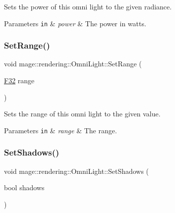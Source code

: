 Sets the power of this omni light to the given radiance.


\begin{DoxyParams}[1]{Parameters}
\mbox{\tt in}  & {\em power} & The power in watts. \\
\hline
\end{DoxyParams}
\hypertarget{classmage_1_1rendering_1_1_omni_light_a71d9cbef05c421a154b202e7a9b8eedb}{}\label{classmage_1_1rendering_1_1_omni_light_a71d9cbef05c421a154b202e7a9b8eedb} 
\subsubsection{\texorpdfstring{Set\+Range()}{SetRange()}}
{\footnotesize\ttfamily void mage\+::rendering\+::\+Omni\+Light\+::\+Set\+Range (\begin{DoxyParamCaption}\item[{\hyperlink{namespacemage_aa97e833b45f06d60a0a9c4fc22ae02c0}{F32}}]{range }\end{DoxyParamCaption})\hspace{0.3cm}{\ttfamily [noexcept]}}

Sets the range of this omni light to the given value.


\begin{DoxyParams}[1]{Parameters}
\mbox{\tt in}  & {\em range} & The range. \\
\hline
\end{DoxyParams}
\hypertarget{classmage_1_1rendering_1_1_omni_light_a2817ab7a4c514785f01bf2e40c6245cb}{}\label{classmage_1_1rendering_1_1_omni_light_a2817ab7a4c514785f01bf2e40c6245cb} 
\subsubsection{\texorpdfstring{Set\+Shadows()}{SetShadows()}}
{\footnotesize\ttfamily void mage\+::rendering\+::\+Omni\+Light\+::\+Set\+Shadows (\begin{DoxyParamCaption}\item[{bool}]{shadows }\end{DoxyParamCaption})\hspace{0.3cm}{\ttfamily [noexcept]}}

